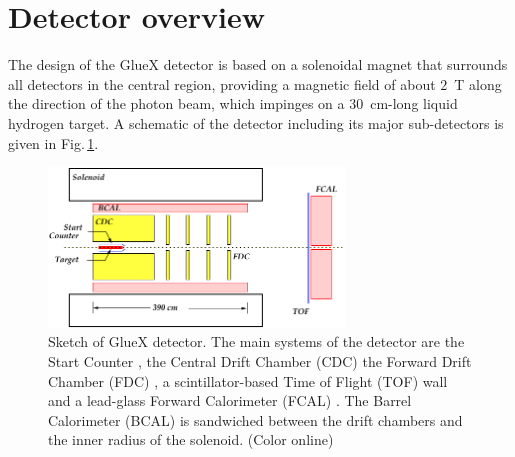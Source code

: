 
\section[Detector overview (Curtis)]{Detector overview \label{sec:overview}}
The design of the GlueX detector \cite{Ghoul:2015ifw} is based on a solenoidal magnet that surrounds all detectors in the central region, providing a magnetic field of about $2$~T along the direction of the photon beam, which impinges on a 
$30$~cm-long liquid hydrogen target.  A schematic of the detector including its major sub-detectors is given in Fig.\,\ref{fig:gluexsketch}.
\begin{figure}[tbp]
\begin{center}
\includegraphics[width=0.7\textwidth]{figures/GlueX_Sketch.pdf}  
\caption{\label{fig:gluexsketch}          
  Sketch of GlueX detector.  The main systems of the detector are the Start Counter \cite{hdnote3064}, the Central Drift Chamber (CDC) \cite{VanHaarlem:2010yq} the Forward Drift Chamber (FDC) \cite{Pentchev2017281}, a scintillator-based Time of Flight (TOF) wall and a lead-glass Forward Calorimeter (FCAL) \cite{MORIYA201360}. The Barrel Calorimeter (BCAL) is sandwiched between the drift chambers and the inner radius of the solenoid.  (Color online)
}   
\end{center}  
\end{figure}
